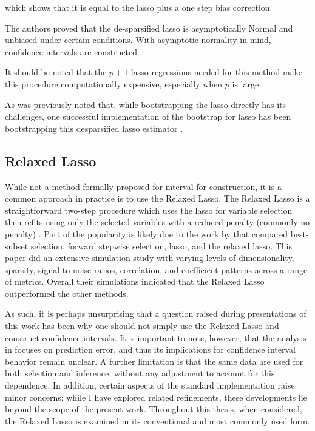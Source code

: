 \noindent which shows that it is equal to the lasso plus a one step bias correction.

The authors proved that the de-sparsified lasso is asymptotically Normal and unbiased under certain conditions. With asymptotic normality in mind, confidence intervals are constructed.

It should be noted that the $p+1$ lasso regressions needed for this method make this procedure computationally expensive, especially when $p$ is large.

As was previously noted that, while bootstrapping the lasso directly has its challenges, one successful implementation of the bootstrap for lasso has been bootstrapping this desparsified lasso estimator \citep{Dezeure2017}.

\subsection{Relaxed Lasso}

While not a method formally proposed for interval for construction, it is a common approach in practice is to use the Relaxed Lasso. The Relaxed Lasso is a straightforward two-step procedure which uses the lasso for variable selection then refits using only the selected variables with a reduced penalty (commonly no penalty) \citep{Meinshausen2007}. Part of the popularity is likely due to the work by \cite{hastie2017} that compared best-subset selection, forward stepwise selection, lasso, and the relaxed lasso. This paper did an extensive simulation study with varying levels of dimensionality, sparsity, signal-to-noise ratios, correlation, and coefficient patterns across a range of metrics. Overall their simulations indicated that the Relaxed Lasso outperformed the other methods. 

As such, it is perhaps unsurprising that a question raised during presentations of this work has been why one should not simply use the Relaxed Lasso and construct confidence intervals. It is important to note, however, that the analysis in \citet{hastie2017} focuses on prediction error, and thus its implications for confidence interval behavior remain unclear. A further limitation is that the same data are used for both selection and inference, without any adjustment to account for this dependence. In addition, certain aspects of the standard implementation raise minor concerns; while I have explored related refinements, these developments lie beyond the scope of the present work. Throughout this thesis, when considered, the Relaxed Lasso is examined in its conventional and most commonly used form.

